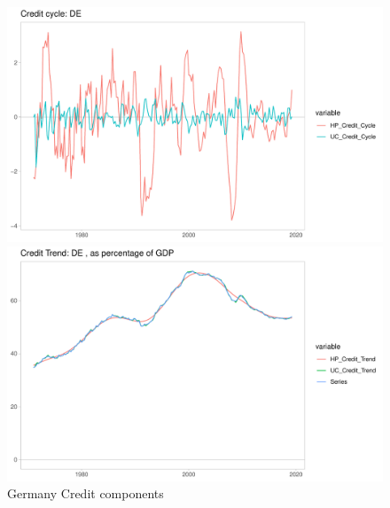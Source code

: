 \documentclass[fleqn]{article}
\begin{document}
\begin{outline}[enumerate]
\begin{figure}[h!]
	\caption{Germany Credit components}	
	\centerline{\includegraphics[scale=0.7]{../Output/Graphs/Credit_cycle_DE.pdf}}
	\centerline{\includegraphics[scale=0.7]{../Output/Graphs/Credit_trend_DE.pdf}}
\end{figure}


\end{outline}
\end{document}
